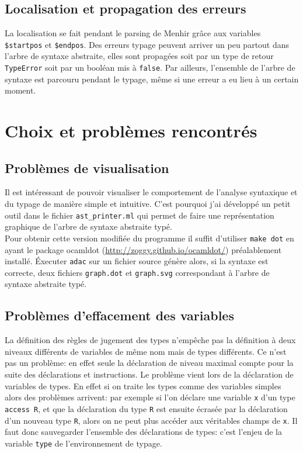 \documentclass{article}
\begin{document}
  \subsection{Localisation et propagation des erreurs}
  La localisation se fait pendant le parsing de Menhir grâce aux variables \texttt{\$startpos} et \texttt{\$endpos}.
  Des erreurs typage peuvent arriver un peu partout dans l'arbre de syntaxe abstraite, elles sont propagées soit par un type de retour \texttt{TypeError} soit par un booléan mis à \texttt{false}.
  Par ailleurs, l'ensemble de l'arbre de syntaxe est parcouru pendant le typage, même si une erreur a eu lieu à un certain moment. 
  \section{Choix et problèmes rencontrés}
  \subsection{Problèmes de visualisation}
  Il est intéressant de pouvoir visualiser le comportement de l'analyse syntaxique et du typage de manière simple et intuitive.
  C'est pourquoi j'ai développé un petit outil dans le fichier \texttt{ast\_printer.ml} qui permet de faire une représentation graphique de l'arbre de syntaxe abstraite typé. \\
  Pour obtenir cette version modifiée du programme il suffit d'utiliser \texttt{make dot} en ayant le package ocamldot (\url{http://zoggy.github.io/ocamldot/}) préalablement installé.
  Éxecuter \texttt{adac} sur un fichier source génère alors, si la syntaxe est correcte, deux fichiers \texttt{graph.dot} et \texttt{graph.svg} correspondant à l'arbre de syntaxe abstraite typé.
  \subsection{Problèmes d'effacement des variables}
  La définition des règles de jugement des types n'empêche pas la définition à deux niveaux différents de variables de même nom mais de types différents.
  Ce n'est pas un problème: en effet seule la déclaration de niveau maximal compte pour la suite des déclarations et instructions.
  Le problème vient lors de la déclaration de variables de types. En effet si on traite les types comme des variables simples alors des problèmes arrivent:
  par exemple si l'on déclare une variable \texttt{x} d'un type \texttt{access R}, et que la déclaration du type \texttt{R} est ensuite écrasée par la déclaration d'un nouveau type \texttt{R}, alors on ne peut plus accéder aux véritables champs de \texttt{x}.
  Il faut donc sauvegarder l'ensemble des déclarations de types: c'est l'enjeu de la variable \texttt{type} de l'environnement de typage.
\end{document}
